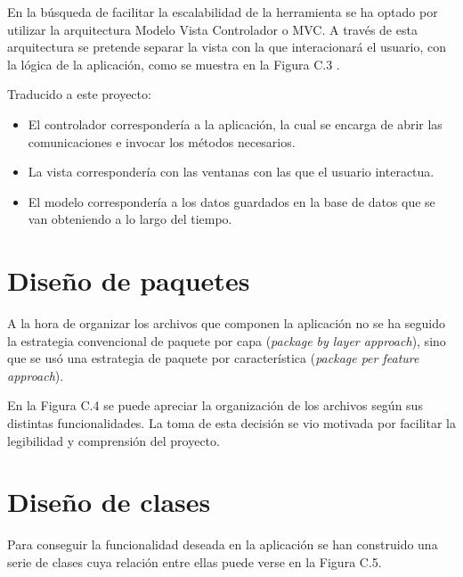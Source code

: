 En la búsqueda de facilitar la escalabilidad de la herramienta se ha optado por utilizar la arquitectura Modelo Vista Controlador o MVC. A través de esta arquitectura se pretende separar la vista con la que interacionará el usuario, con la lógica de la aplicación, como se muestra en la Figura C.3 \cite{web:mvc}.


Traducido a este proyecto:
\begin{itemize}
	\item El controlador correspondería a la aplicación, la cual se encarga de abrir las comunicaciones e invocar los métodos necesarios.
	\item La vista correspondería con las ventanas con las que el usuario interactua.
	\item El modelo correspondería a los datos guardados en la base de datos que se van obteniendo a lo largo del tiempo.
\end{itemize}

\section{Diseño de paquetes}

A la hora de organizar los archivos que componen la aplicación no se ha seguido la estrategia convencional de paquete por capa (\textit{package by layer approach}), sino que se usó una estrategia de paquete por característica (\textit{package per feature approach}).

En la Figura C.4 se puede apreciar la organización de los archivos según sus distintas funcionalidades. La toma de esta decisión se vio motivada por facilitar la legibilidad y comprensión del proyecto.


\section{Diseño de clases}

Para conseguir la funcionalidad deseada en la aplicación se han construido una serie de clases cuya relación entre ellas puede verse en la Figura C.5.

